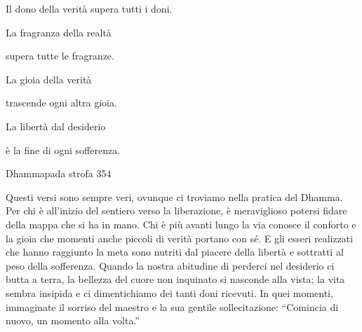 \documentclass[a4paper,portrait,12pt]{article}
\begin{document}
\newpage



Il dono della verit\`{a} supera tutti i doni.


La fragranza della realt\`{a} 


supera tutte le fragranze.


La gioia della verit\`{a}


trascende ogni altra gioia.


La libert\`{a} dal desiderio


\`{e} la fine di ogni sofferenza.





Dhammapada strofa 354


\newpage



Questi versi sono sempre veri, ovunque ci troviamo nella pratica del Dhamma. Per chi \`{e} all'inizio del sentiero verso la liberazione, \`{e} meraviglioso potersi fidare della mappa che si ha in mano. Chi \`{e} più avanti lungo la via conosce il conforto e la gioia che momenti anche piccoli di verit\`{a} portano con s\'{e}. E gli esseri realizzati che hanno raggiunto la meta sono nutriti dal piacere della libert\`{a} e sottratti al peso della sofferenza. Quando la nostra abitudine di perderci nel desiderio ci butta a terra, la bellezza del cuore non inquinato si nasconde alla vista; la vita sembra insipida e ci dimentichiamo dei tanti doni ricevuti. In quei momenti, immaginate il sorriso del maestro e la sua gentile sollecitazione: ``Comincia di nuovo, un momento alla volta.''




















\begin{center}

\end{center}
\end{document}
